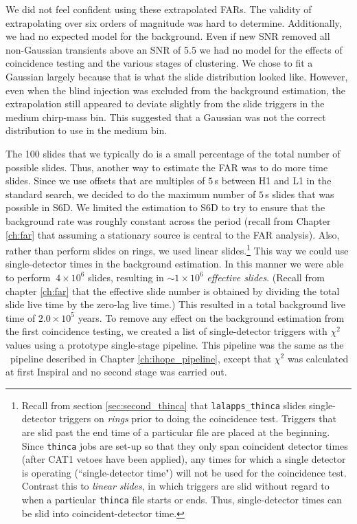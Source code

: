 We did not feel confident using these extrapolated \acp{FAR}. The validity of
extrapolating over six orders of magnitude was hard to determine. Additionally,
we had no expected model for the background. Even if new \ac{SNR} removed all
non-Gaussian transients above an \ac{SNR} of 5.5 we had no model for the
effects of coincidence testing and the various stages of clustering. We chose
to fit a Gaussian largely because that is what the slide distribution looked
like. However, even when the blind injection was excluded from the background
estimation, the extrapolation still appeared to deviate slightly from the slide
triggers in the medium chirp-mass bin. This suggested that a Gaussian was not
the correct distribution to use in the medium bin.

The 100 slides that we typically do is a small percentage of the total number
of possible slides. Thus, another way to estimate the \ac{FAR} was to do more
time slides. Since we use offsets that are multiples of $5\,$s between H1 and
L1 in the standard search, we decided to do the maximum number of $5\,$s slides
that was possible in S6D. We limited the estimation to S6D to try to ensure
that the background rate was roughly constant across the period (recall from
Chapter \ref{ch:far} that assuming a stationary source is central to the
\ac{FAR} analysis). Also, rather than perform slides on rings, we used linear
slides.\footnote{Recall from section \ref{sec:second_thinca} that
\texttt{lalapps\_thinca} slides single-detector triggers on \emph{rings} prior
to doing the coincidence test. Triggers that are slid past the end time of a
particular file are placed at the beginning. Since \texttt{thinca} jobs are
set-up so that they only span coincident detector times (after CAT1 vetoes have
been applied), any times for which a single detector is operating
(``single-detector time") will not be used for the coincidence test. Contrast
this to \emph{linear slides}, in which triggers are slid without regard to when
a particular \texttt{thinca} file starts or ends. Thus, single-detector times
can be slid into coincident-detector time.} This way we could use
single-detector times in the background estimation. In this manner we were able
to perform $~4\times 10^6$ slides, resulting in $\sim 1 \times 10^6$
\emph{effective slides}.  (Recall from chapter \ref{ch:far} that the effective
slide number is obtained by dividing the total slide live time by the zero-lag
live time.) This resulted in a total background live time of $2.0\times 10^5$
years. To remove any effect on the background estimation from the first
coincidence testing, we created a list of single-detector triggers with
$\chi^2$ values using a prototype single-stage pipeline. This pipeline was the
same as the \hipe~pipeline described in Chapter \ref{ch:ihope_pipeline},
except that $\chi^2$ was calculated at first Inspiral and no second stage was
carried out. 

